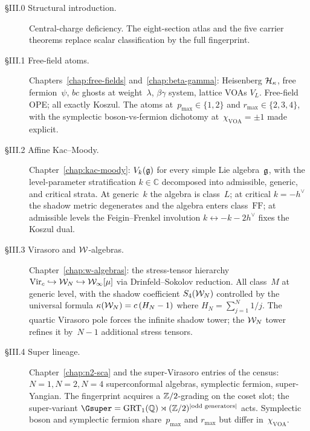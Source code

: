 \begin{description}
 \item[\S III.0 Structural introduction.]
 \label{sec:part-iii-0}
 Central-charge deficiency. The eight-section atlas and the five
 carrier theorems replace scalar classification by the full
fingerprint.

 \item[\S III.1 Free-field atoms.]
 \label{sec:part-iii-1}
 Chapters~\ref{chap:free-fields} and~\ref{chap:beta-gamma}: Heisenberg
 $\mathcal{H}_\kappa$, free fermion~$\psi$, $bc$ ghosts at weight~$\lambda$,
 $\beta\gamma$ system, lattice VOAs $V_L$. Free-field OPE; all exactly
 Koszul. The atoms at~$p_{\max} \in \{1,2\}$ and
 $r_{\max} \in \{2,3,4\}$, with the symplectic boson-vs-fermion
 dichotomy at~$\chi_{\mathrm{VOA}} = \pm 1$ made explicit.

 \item[\S III.2 Affine Kac--Moody.]
 \label{sec:part-iii-2}
 Chapter~\ref{chap:kac-moody}: $V_k(\mathfrak{g})$ for every simple
 Lie algebra~$\mathfrak{g}$, with the
 level-parameter stratification $k \in \mathbb{C}$ decomposed into
 admissible, generic, and critical strata. At generic~$k$ the algebra
 is class~$L$; at critical $k = -h^\vee$ the shadow metric
 degenerates and the algebra enters class~$\mathrm{FF}$; at
 admissible levels the Feigin--Frenkel involution
 $k \leftrightarrow -k - 2h^\vee$ fixes the Koszul dual.

 \item[\S III.3 Virasoro and $\mathcal{W}$-algebras.]
 \label{sec:part-iii-3}
 Chapter~\ref{chap:w-algebras}: the stress-tensor hierarchy
 $\mathrm{Vir}_c \hookrightarrow \mathcal{W}_N \hookrightarrow \mathcal{W}_\infty[\mu]$
 via Drinfeld--Sokolov reduction. All class~$M$ at generic
 level, with the shadow coefficient
 $S_4(\mathcal{W}_N)$ controlled by the universal formula
 $\kappa(\mathcal{W}_N) = c\,(H_N - 1)$ where
 $H_N = \sum_{j=1}^{N} 1/j$. The quartic
 Virasoro pole forces the infinite shadow tower; the
 $\mathcal{W}_N$ tower refines it by~$N-1$ additional stress tensors.

 \item[\S III.4 Super lineage.]
 \label{sec:part-iii-4}
 Chapter~\ref{chap:n2-sca} and the super-Virasoro entries
 of the census: $N=1, N=2, N=4$ superconformal algebras, symplectic
 fermion, super-Yangian. The fingerprint acquires a
 $\mathbb{Z}/2$-grading on the coset slot; the super-variant
 $\Gsuper = \GRT(\Q) \rtimes (\Z/2)^{|\text{odd generators}|}$ acts.
 Symplectic boson and symplectic fermion share~$p_{\max}$ and
 $r_{\max}$ but differ in~$\chi_{\mathrm{VOA}}$.


\end{description}
